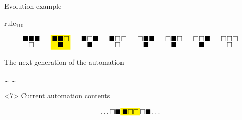 \documentclass[presentation,aspectratio=169,smaller]{beamer}
\begin{document}
\begin{frame}[label={sec:org3545853},t]{Evolution example}
\begin{onlyenv}
\(\text{rule}_{110}\)

\begin{equation*}
  \begingroup
  \setlength\arraycolsep{0.25pt}
  \renewcommand{\arraystretch}{0.5}
  \begin{matrix}
    \blacksquare & \blacksquare & \blacksquare \\
    & \square &
  \end{matrix}\mspace{28mu}
  \mathcolorbox{yellow}{
    \begin{matrix}
      \blacksquare & \blacksquare & \square \\
      & \blacksquare &
    \end{matrix}
  }\mspace{28mu}
  \begin{matrix}
    \blacksquare & \square & \blacksquare \\
    & \blacksquare &
  \end{matrix}\mspace{28mu}
  \begin{matrix}
    \blacksquare & \square & \square \\
    & \square &
  \end{matrix}\mspace{28mu}
  \begin{matrix}
    \square & \blacksquare & \blacksquare \\
    & \blacksquare &
  \end{matrix}\mspace{28mu}
  \begin{matrix}
    \square & \blacksquare & \square \\
    & \blacksquare &
  \end{matrix}\mspace{28mu}
  \begin{matrix}
    \square & \square & \blacksquare \\
    & \blacksquare &
  \end{matrix}\mspace{28mu}
  \begin{matrix}
    \square & \square & \square \\
    & \square &
  \end{matrix}
  \endgroup
\end{equation*}

The next generation of the automation

\hfill \dots
\blacksquare
\blacksquare
{}
\mspace{14mu}
\mspace{14mu}
\mspace{14mu}
\dots \hfill
\end{onlyenv}

\begin{onlyenv}<7>
Current automation contents

\begin{equation*}
  \hfill
  \dots
  \square
  \blacksquare
  \mathcolorbox{yellow}{
    \blacksquare
    \square
    \square
  }
  \square
  \blacksquare
  \dots
  \hfill
\end{equation*}


\end{onlyenv}
\end{frame}
\end{document}
